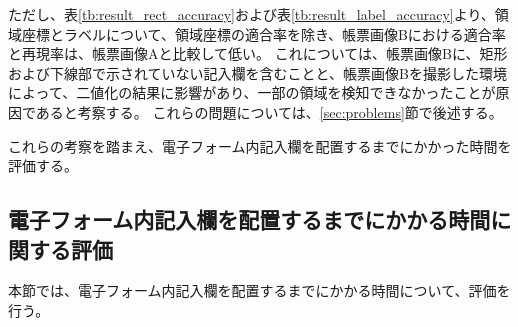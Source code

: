 ただし、表\ref{tb:result_rect_accuracy}および表\ref{tb:result_label_accuracy}より、領域座標とラベルについて、領域座標の適合率を除き、帳票画像Bにおける適合率と再現率は、帳票画像Aと比較して低い。
これについては、帳票画像Bに、矩形および下線部で示されていない記入欄を含むことと、帳票画像Bを撮影した環境によって、二値化の結果に影響があり、一部の領域を検知できなかったことが原因であると考察する。
これらの問題については、\ref{sec:problems}節で後述する。

これらの考察を踏まえ、電子フォーム内記入欄を配置するまでにかかった時間を評価する。

\subsection{電子フォーム内記入欄を配置するまでにかかる時間に関する評価}\label{subsec:evalue_required_time}
本節では、電子フォーム内記入欄を配置するまでにかかる時間について、評価を行う。

